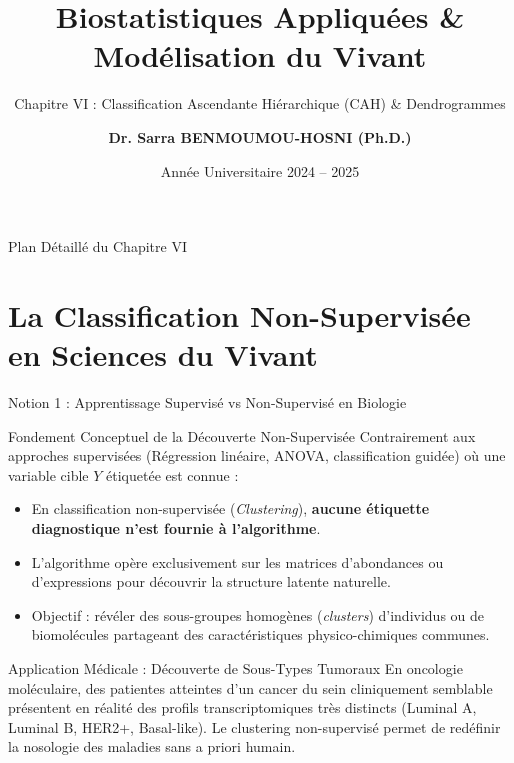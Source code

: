\documentclass[aspectratio=169,10pt]{beamer}
\title{\textbf{Biostatistiques Appliquées \& Modélisation du Vivant}}
\subtitle{Chapitre VI : Classification Ascendante Hiérarchique (CAH) \& Dendrogrammes}
\author{\textbf{Dr. Sarra BENMOUMOU-HOSNI (Ph.D.)}}
\institute{
  Faculté des Sciences --- Département de Biologie\\
  Master 2 : Biochimie Appliquée\\
  \textbf{Université M'Hamed Bougara de Boumerdès (UMBB)}
}
\date{Année Universitaire 2024 -- 2025}
\begin{document}
\begin{frame}[plain]
  \titlepage
\end{frame}

\begin{frame}{Plan Détaillé du Chapitre VI}
  {\footnotesize\tableofcontents}
\end{frame}

\section{La Classification Non-Supervisée en Sciences du Vivant}

\begin{frame}{Notion 1 : Apprentissage Supervisé vs Non-Supervisé en Biologie}
  \begin{conceptbox}{Fondement Conceptuel de la Découverte Non-Supervisée}
    \footnotesize
    Contrairement aux approches supervisées (Régression linéaire, ANOVA, classification guidée) où une variable cible $Y$ étiquetée est connue :
    \begin{itemize}
      \item En classification non-supervisée (\textit{Clustering}), \textbf{aucune étiquette diagnostique n'est fournie à l'algorithme}.
      \item L'algorithme opère exclusivement sur les matrices d'abondances ou d'expressions pour découvrir la structure latente naturelle.
      \item Objectif : révéler des sous-groupes homogènes (\textit{clusters}) d'individus ou de biomolécules partageant des caractéristiques physico-chimiques communes.
    \end{itemize}
  \end{conceptbox}
  \vspace{1mm}
  \begin{biobox}{Application Médicale : Découverte de Sous-Types Tumoraux}
    \footnotesize
    En oncologie moléculaire, des patientes atteintes d'un cancer du sein cliniquement semblable présentent en réalité des profils transcriptomiques très distincts (Luminal A, Luminal B, HER2+, Basal-like). Le clustering non-supervisé permet de redéfinir la nosologie des maladies sans a priori humain.
  \end{biobox}
\end{frame}
\end{document}
